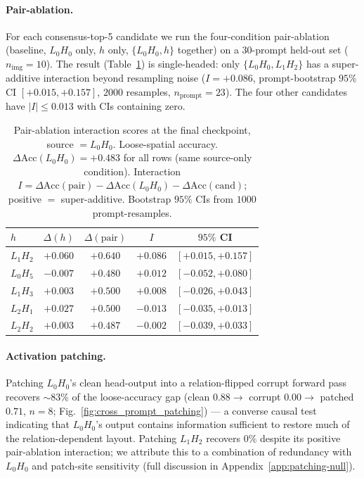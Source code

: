 \documentclass{article}
\begin{document}
\paragraph{Pair-ablation.}
\label{sec:pair-ablation}

For each consensus-top-5 candidate we run the four-condition pair-ablation (baseline, $L_0H_0$ only, $h$ only, $\{L_0H_0, h\}$ together) on a $30$-prompt held-out set ($n_\text{img}{=}10$). The result (Table~\ref{tab:pair-ablation}) is single-headed: only $\{L_0H_0, L_1H_2\}$ has a super-additive interaction beyond resampling noise ($I = +0.086$, prompt-bootstrap $95\%$ CI $[+0.015, +0.157]$, $2000$ resamples, $n_\text{prompt}{=}23$). The four other candidates have $|I| \leq 0.013$ with CIs containing zero.

\begin{table}[t]
\centering
\small
\caption{Pair-ablation interaction scores at the final checkpoint, source $= L_0H_0$. Loose-spatial accuracy. $\Delta\mathrm{Acc}(L_0H_0) = +0.483$ for all rows (same source-only condition). Interaction $I = \Delta\mathrm{Acc}(\text{pair}) - \Delta\mathrm{Acc}(L_0H_0) - \Delta\mathrm{Acc}(\text{cand})$; positive $=$ super-additive. Bootstrap $95\%$ CIs from $1000$ prompt-resamples.}
\label{tab:pair-ablation}
\setlength{\tabcolsep}{3pt}
\begin{tabular}{lcccc}
\toprule
$h$ & $\Delta(h)$ & $\Delta(\text{pair})$ & $I$ & $95\%$ CI \\
\midrule
$L_1H_2$ & $+0.060$ & $+0.640$ & $+0.086$ & $[+0.015, +0.157]$ \\
$L_0H_5$ & $-0.007$ & $+0.480$ & $+0.012$ & $[-0.052, +0.080]$ \\
$L_1H_3$ & $+0.003$ & $+0.500$ & $+0.008$ & $[-0.026, +0.043]$ \\
$L_2H_1$ & $+0.027$ & $+0.500$ & $-0.013$ & $[-0.035, +0.013]$ \\
$L_2H_2$ & $+0.003$ & $+0.487$ & $-0.002$ & $[-0.039, +0.033]$ \\
\bottomrule
\end{tabular}
\end{table}

\paragraph{Activation patching.}
Patching $L_0H_0$'s clean head-output into a relation-flipped corrupt forward pass recovers $\sim\!83\%$ of the loose-accuracy gap (clean $0.88\to$ corrupt $0.00\to$ patched $0.71$, $n{=}8$; Fig.~\ref{fig:cross_prompt_patching}) --- a converse causal test indicating that $L_0H_0$'s output contains information sufficient to restore much of the relation-dependent layout. Patching $L_1H_2$ recovers $0\%$ despite its positive pair-ablation interaction; we attribute this to a combination of redundancy with $L_0H_0$ and patch-site sensitivity (full discussion in Appendix~\ref{app:patching-null}).
\end{document}
